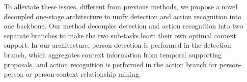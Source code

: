 \documentclass[final]{cvpr}
\begin{document}
To alleviate these issues, different from previous methods, we propose a novel decoupled one-stage architecture to unify detection and action recognition into one backbone. Our method decouples detection and action recognition into two separate branches to make the two sub-tasks learn their own optimal context support. 
In our architecture, person detection is performed in the detection branch, which aggregates context information from temporal supporting proposals, and action recognition is performed in the action branch for person-person or person-context relationship mining.
\end{document}
